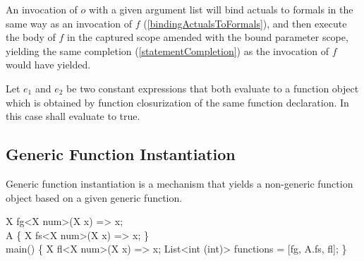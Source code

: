 \documentclass[makeidx]{article}
\begin{document}
{\LMHash{}%
An invocation of $o$ with a given argument list will bind actuals to formals
in the same way as an invocation of $f$
(\ref{bindingActualsToFormals}),
and then execute the body of $f$
in the captured scope amended with the bound parameter scope,
yielding the same completion
(\ref{statementCompletion})
as the invocation of $f$ would have yielded.

\LMHash{}%
Let $e_1$ and $e_2$ be two constant expressions that both
evaluate to a function object which is obtained by function closurization
of the same function declaration.
In this case  shall evaluate to true.



\subsection{Generic Function Instantiation}


\LMHash{}%
Generic function instantiation is a mechanism that yields
a non-generic function object based on a given generic function.


\begin{dartCode}
X fg<X \EXTENDS{} num>(X x) => x;
\\
\CLASS{} A \{
  \STATIC{} X fs<X \EXTENDS{} num>(X x) => x;
\}
\\
\VOID{} main() \{
  X fl<X \EXTENDS{} num>(X x) => x;
  List<int \FUNCTION{}(int)> functions = [fg, A.fs, fl];
\}
\end{dartCode}

}
\end{document}
